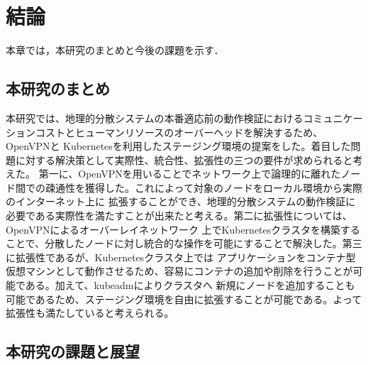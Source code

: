 \chapter{結論}
\label{conclusion}

本章では，本研究のまとめと今後の課題を示す．

\section{本研究のまとめ}
本研究では、地理的分散システムの本番適応前の動作検証におけるコミュニケーションコストとヒューマンリソースのオーバーヘッドを解決するため、OpenVPNと
Kubernetesを利用したステージング環境の提案をした。着目した問題に対する解決策として実際性、統合性、拡張性の三つの要件が求められると考えた。
第一に、OpenVPNを用いることでネットワーク上で論理的に離れたノード間での疎通性を獲得した。これによって対象のノードをローカル環境から実際のインターネット上に
拡張することができ、地理的分散システムの動作検証に必要である実際性を満たすことが出来たと考える。第二に拡張性については、OpenVPNによるオーバーレイネットワーク
上でKubernetesクラスタを構築することで、分散したノードに対し統合的な操作を可能にすることで解決した。第三に拡張性であるが、Kubernetesクラスタ上では
アプリケーションをコンテナ型仮想マシンとして動作させるため、容易にコンテナの追加や削除を行うことが可能である。加えて、kubeadmによりクラスタへ
新規にノードを追加することも可能であるため、ステージング環境を自由に拡張することが可能である。よって拡張性も満たしていると考えられる。

\section{本研究の課題と展望}

